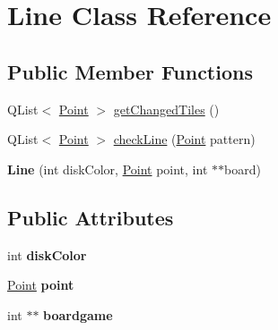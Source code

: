 \hypertarget{classLine}{\section{Line Class Reference}
\label{classLine}
}
\subsection*{Public Member Functions}
\begin{DoxyCompactItemize}
\item 
Q\-List$<$ \hyperlink{classPoint}{Point} $>$ \hyperlink{classLine_a91d2b5b17efce31863c4ba2545cc3917}{get\-Changed\-Tiles} ()
\item 
Q\-List$<$ \hyperlink{classPoint}{Point} $>$ \hyperlink{classLine_ac7cf1abd6bdabad3ae7589c716920af6}{check\-Line} (\hyperlink{classPoint}{Point} pattern)
\item 
\hypertarget{classLine_ad1cf45f33ea7256560fe6ce4fc2d1eb2}{{\bfseries Line} (int disk\-Color, \hyperlink{classPoint}{Point} point, int $\ast$$\ast$board)}\label{classLine_ad1cf45f33ea7256560fe6ce4fc2d1eb2}

\end{DoxyCompactItemize}
\subsection*{Public Attributes}
\begin{DoxyCompactItemize}
\item 
\hypertarget{classLine_a35580843d14864454cddd16d7806049c}{int {\bfseries disk\-Color}}\label{classLine_a35580843d14864454cddd16d7806049c}

\item 
\hypertarget{classLine_adaf06f2ff9499915e340b615ecade2a7}{\hyperlink{classPoint}{Point} {\bfseries point}}\label{classLine_adaf06f2ff9499915e340b615ecade2a7}

\item 
\hypertarget{classLine_ac9918112d0314311e32c819cdc100ebf}{int $\ast$$\ast$ {\bfseries boardgame}}\label{classLine_ac9918112d0314311e32c819cdc100ebf}

\end{DoxyCompactItemize}


